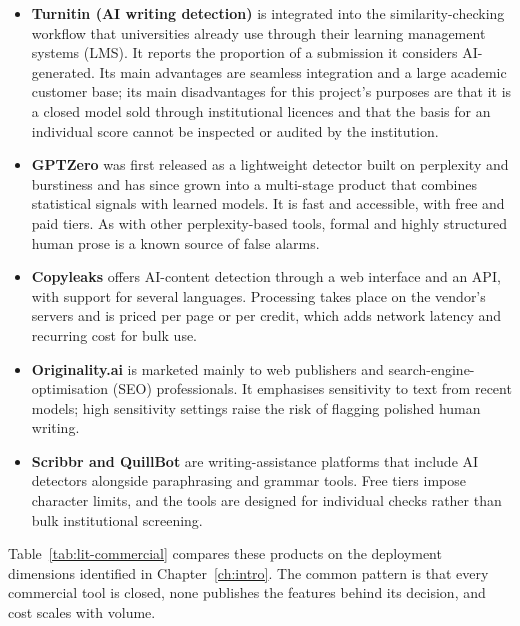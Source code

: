 \begin{itemize}
  \item \textbf{Turnitin (AI writing detection)} is integrated into the
        similarity-checking workflow that universities already use through
        their learning management systems (LMS). It reports the proportion
        of a submission it considers AI-generated. Its main advantages are
        seamless integration and a large academic customer base; its main
        disadvantages for this project's purposes are that it is a closed
        model sold through institutional licences and that the basis for an
        individual score cannot be inspected or audited by the institution.
  \item \textbf{GPTZero} was first released as a lightweight detector built on
        perplexity and burstiness and has since grown into a multi-stage
        product that combines statistical signals with learned models. It is
        fast and accessible, with free and paid tiers. As with other
        perplexity-based tools, formal and highly structured human prose is a
        known source of false alarms.
  \item \textbf{Copyleaks} offers AI-content detection through a web interface
        and an API, with support for several languages. Processing takes place
        on the vendor's servers and is priced per page or per credit, which
        adds network latency and recurring cost for bulk use.
  \item \textbf{Originality.ai} is marketed mainly to web publishers and
        search-engine-optimisation (SEO) professionals. It emphasises
        sensitivity to text from recent models; high sensitivity settings
        raise the risk of flagging polished human writing.
  \item \textbf{Scribbr and QuillBot} are writing-assistance platforms that
        include AI detectors alongside paraphrasing and grammar tools. Free
        tiers impose character limits, and the tools are designed for
        individual checks rather than bulk institutional screening.
\end{itemize}

Table~\ref{tab:lit-commercial} compares these products on the deployment
dimensions identified in Chapter~\ref{ch:intro}. The common pattern is that
every commercial tool is closed, none publishes the features behind its
decision, and cost scales with volume.

